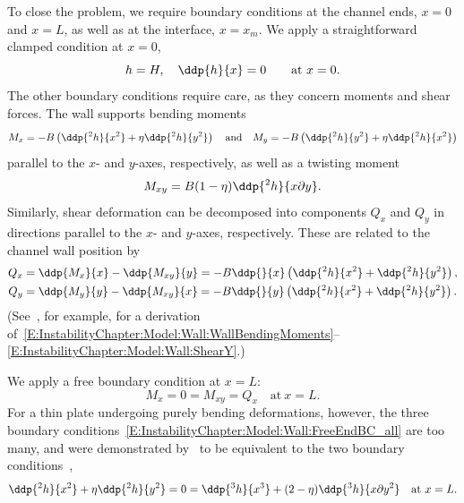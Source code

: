 To close the problem, we require boundary conditions at the channel ends, $x= 0$ and $x = L$, as well as at the interface, $x = x_m$. We apply a straightforward clamped condition at $x = 0$,
\begin{equation}\label{E:InstabilityChapter:Model:Wall:ClampedBC}
h= H, \quad \ddp{h}{x} = 0 \qquad \text{at}~x = 0.
\end{equation}
The other boundary conditions require care, as they concern moments and shear forces. The wall supports bending moments
\begin{equation}\label{E:InstabilityChapter:Model:Wall:WallBendingMoments}
M_x = -B\left(\ddp{^2 h}{x^2} + \poisson \ddp{^2 h}{y^2}\right) \quad \text{and}\quad M_y = -B\left(\ddp{^2 h}{y^2} + \poisson \ddp{^2 h}{x^2}\right)
\end{equation}
parallel to the $x$- and $y$-axes, respectively, as well as a twisting moment
\begin{equation}\label{E:InstabilityChapter:Model:Wall:WallTwistingMoments}
M_{xy} = B(1-\poisson)\ddp{^2 h}{x \partial y}.
\end{equation}
Similarly, shear deformation can be decomposed into components $Q_x$ and $Q_y$ in directions parallel to the $x$- and $y$-axes, respectively. These are related to the channel wall position by
\begin{align}
Q_x &=  \ddp{M_x}{x} -\ddp{M_{xy}}{y} = -B \ddp{}{x} \left(\ddp{^2 h}{x^2} +\ddp{^2 h}{y^2}\right),\label{E:InstabilityChapter:Model:Wall:ShearX}\\
Q_y &= \ddp{M_{y}}{y} - \ddp{M_{xy}}{x} = -B \ddp{}{y} \left(\ddp{^2 h}{x^2} + \ddp{^2 h}{y^2}\right).\label{E:InstabilityChapter:Model:Wall:ShearY}
\end{align}
(See~\cite{Timoshenko1959}, for example, for a derivation of~\eqref{E:InstabilityChapter:Model:Wall:WallBendingMoments}--\eqref{E:InstabilityChapter:Model:Wall:ShearY}.)

We apply a free boundary condition at $x = L$:
\begin{equation}\label{E:InstabilityChapter:Model:Wall:FreeEndBC_all}
M_x = 0 = M_{xy} = Q_x \quad \text{at}~x = L.
\end{equation}
For a thin plate undergoing purely bending deformations, however, the three boundary conditions~\eqref{E:InstabilityChapter:Model:Wall:FreeEndBC_all} are too many, and were demonstrated by~\cite{Tait1883} to be equivalent to the two boundary conditions~\citep{Timoshenko1959},
\begin{equation}\label{E:InstabilityChapter:Model:Wall:FreeEndBC}
\ddp{^2 h}{x^2} + \poisson \ddp{^2 h}{y^2} = 0 = \ddp{^3 h}{x^3} + (2-\poisson) \ddp{^3 h}{x \partial y^2}\quad \text{at}~x = L.
\end{equation}

